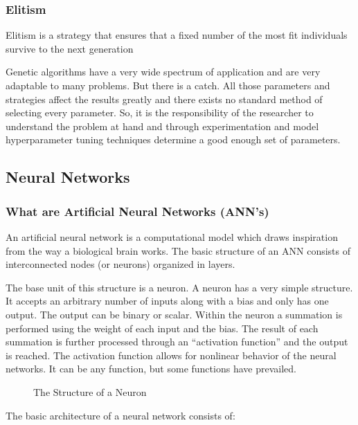 \subsubsection{Elitism}

Elitism is a strategy that ensures that a fixed number of the most fit
individuals survive to the next generation

Genetic algorithms have a very wide spectrum of application and are very adaptable to many problems. But there is a catch. All those parameters and strategies affect the results greatly and there exists no standard method of selecting every parameter. So, it is the responsibility of the researcher to understand the problem at hand and through experimentation and model hyperparameter tuning techniques determine a
good enough set of parameters.

\subsection{Neural Networks}
\label{neural-networks}

\subsubsection{What are Artificial Neural Networks (ANN's)}

An artificial neural network is a computational model which draws inspiration from the way a biological brain works. The basic structure of an ANN consists of interconnected nodes (or neurons) organized in layers.

The base unit of this structure is a neuron. A neuron has a very simple structure. It accepts an arbitrary number of inputs along with a bias and only has one output. The output can be binary or scalar. Within the neuron a summation is performed using the weight of each input and the bias. The result of each summation is further processed through an ``activation function'' and the output is reached. The activation function allows for nonlinear behavior of the neural networks. It can be
any function, but some functions have prevailed.

\begin{figure}[H]
    \centering
    
    \caption{The Structure of a Neuron}

\end{figure}


The basic architecture of a neural network consists of:

